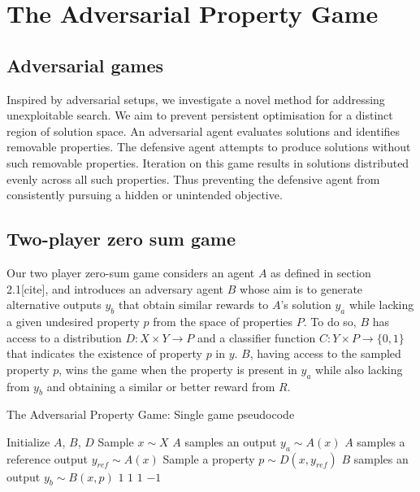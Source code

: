 \section{The Adversarial Property Game} \label{sec:adversarial_games}

\subsection{Adversarial games}

Inspired by adversarial setups, we investigate a novel method for addressing unexploitable search. We aim to prevent persistent optimisation for a distinct region of solution space. An adversarial agent evaluates solutions and identifies removable properties. The defensive agent attempts to produce solutions without such removable properties. Iteration on this game results in solutions distributed evenly across all such properties. Thus preventing the defensive agent from consistently pursuing a hidden or unintended objective.  
 
\subsection{Two-player zero sum game}

Our two player zero-sum game considers an agent $A$ as defined in section 2.1[cite], and introduces an adversary agent $B$ whose aim is to generate alternative outputs $y_{b}$ that obtain similar rewards to $A$'s solution $y_{a}$ while lacking a given undesired property $p$ from the space of properties $P$. To do so, $B$ has access to a distribution $D: X \times Y \to P$ and a classifier function $C: Y\times P  \to \{0, 1\}$ that indicates the existence of property $p$ in $y$. $B$, having access to the sampled property $p$, wins the game when the property is present in $y_a$ while also lacking from $y_b$ and obtaining a similar or better reward from $R$.

\begin{algorithm}\label{alg:apg}
\caption{The Adversarial Property Game: Single game pseudocode}
\begin{algorithmic}[1]
\State Initialize $A$, $B$, $D$
\State Sample $x \sim X$
\State $A$ samples an output $y_a \sim A(x)$
\State $A$ samples a reference output $y_{ref} \sim A(x)$
\State Sample a property $p \sim D(x, y_{ref})$
\State $B$ samples an output $y_b \sim B(x, p)$
    \State \Return $1$ 
    \State \Return $1$ 
    \State \Return $1$ 
\Else
    \State \Return $-1$ 
\EndIf
\end{algorithmic}
\end{algorithm}

